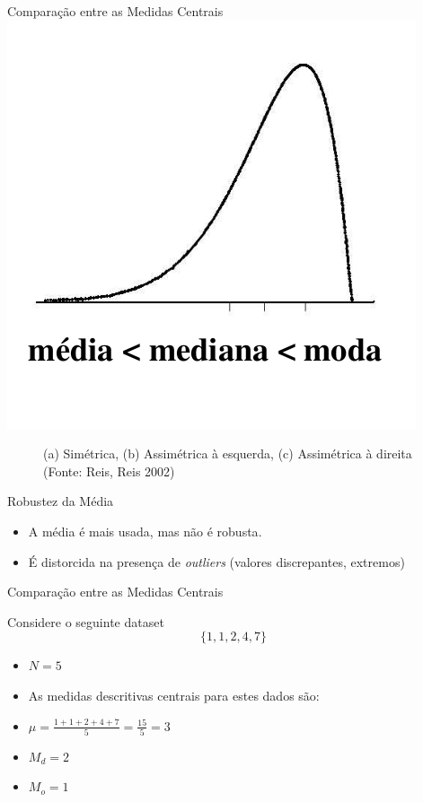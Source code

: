 \documentclass{beamer}
\begin{document}
\begin{frame}{Comparação entre as Medidas Centrais}
    \includegraphics[height=0.4\textheight]{Desc_II/medidas3}
\begin{figure}
  \caption{(a) Simétrica, (b) Assimétrica à esquerda, (c) Assimétrica
    à direita (Fonte: Reis, Reis 2002)}
\end{figure}
\end{frame}

\begin{frame}{Robustez da Média}
  \begin{itemize}
  \item<1> A média é mais usada, mas não é \alert{robusta}.
  \item<1> É distorcida na presença de {\it outliers} (valores
    discrepantes, extremos)
  \end{itemize}
  
\end{frame}
\begin{frame}{Comparação entre as Medidas Centrais}
  \begin{Example}Considere o seguinte dataset $$\{ 1,1,2,4,7\}$$
  \begin{itemize}
  \item $N=5$
  \item As medidas descritivas centrais para estes dados são:
  \item $\mu = \frac{1+1+2+4+7}{5} = \frac{15}{5}= 3$
  \item $M_d = 2$
  \item $M_o = 1$
  \end{itemize}
\end{Example}
\end{frame}
\end{document}
